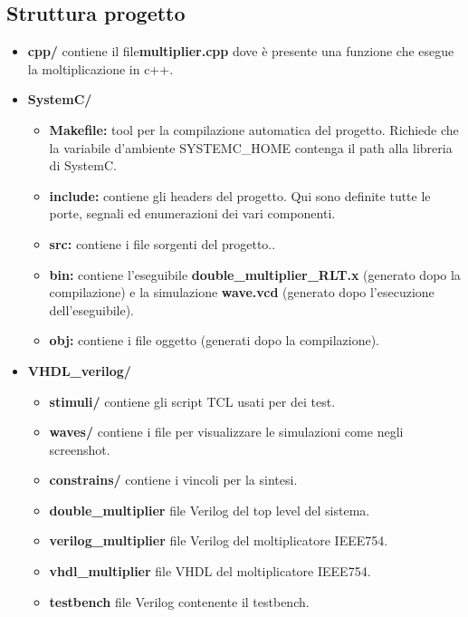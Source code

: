 \documentclass[]{IEEEtran}
\begin{document}
\subsection{Struttura progetto}
\begin{itemize}
    \item \textbf{cpp/} contiene il file\textbf{multiplier.cpp} dove è presente una funzione che esegue la moltiplicazione in c++.
    \item \textbf{SystemC/}
          \begin{itemize}
              \item \textbf{Makefile:} tool per la compilazione automatica del progetto. Richiede che la variabile d'ambiente SYSTEMC\_HOME contenga il path alla libreria di SystemC.
              \item \textbf{include:} contiene gli headers del progetto. Qui sono definite tutte le porte, segnali ed enumerazioni dei vari componenti.
              \item \textbf{src:} contiene i file sorgenti del progetto..
              \item \textbf{bin:} contiene l'eseguibile \textbf{double\_multiplier\_RLT.x} (generato dopo la compilazione) e la simulazione \textbf{wave.vcd} (generato dopo l'esecuzione dell'eseguibile).
              \item \textbf{obj:} contiene i file oggetto (generati dopo la compilazione).
          \end{itemize}
    \item \textbf{VHDL\_verilog/}
          \begin{itemize}
              \item \textbf{stimuli/} contiene gli script TCL usati per dei test.
              \item \textbf{waves/} contiene i file per visualizzare le simulazioni come negli screenshot.
              \item \textbf{constrains/} contiene i vincoli per la sintesi.
              \item \textbf{double\_multiplier} file Verilog del top level del sistema.
              \item \textbf{verilog\_multiplier} file Verilog del moltiplicatore IEEE754.
              \item \textbf{vhdl\_multiplier} file VHDL del moltiplicatore IEEE754.
              \item \textbf{testbench} file Verilog contenente il testbench.
          \end{itemize}
\end{itemize}
\end{document}
